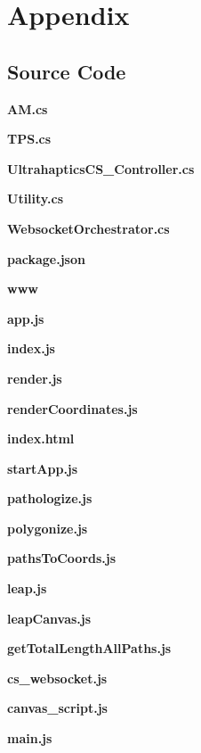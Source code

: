 
\chapter{Appendix}
\label{sec:documentation}

\section{Source Code}
\label{sec:documentation:source_code}
\textbf{AM.cs}

\textbf{TPS.cs}

\textbf{UltrahapticsCS\_Controller.cs}

\textbf{Utility.cs}

\textbf{WebsocketOrchestrator.cs}



\textbf{package.json}

\textbf{www}

\textbf{app.js}

\textbf{index.js}

\textbf{render.js}

\textbf{renderCoordinates.js}

\textbf{index.html}

\textbf{startApp.js}

\textbf{pathologize.js}

\textbf{polygonize.js}

\textbf{pathsToCoords.js}

\textbf{leap.js}

\textbf{leapCanvas.js}

\textbf{getTotalLengthAllPaths.js}

\textbf{cs\_websocket.js}

\textbf{canvas\_script.js}

\textbf{main.js}










